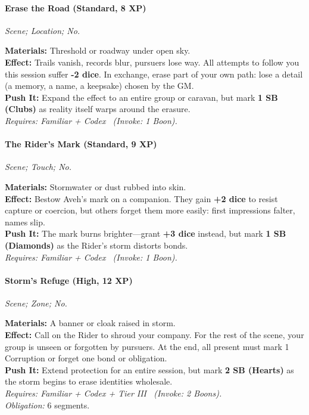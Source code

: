 \paragraph{Erase the Road (Standard, 8 XP)}  
\emph{Scene; Location; No.}  

\textbf{Materials:} Threshold or roadway under open sky.\\
\textbf{Effect:} Trails vanish, records blur, pursuers lose way. All attempts to follow you this session suffer \textbf{-2 dice}. In exchange, erase part of your own path: lose a detail (a memory, a name, a keepsake) chosen by the GM.\\
\textbf{Push It:} Expand the effect to an entire group or caravan, but mark \textbf{1 SB (Clubs)} as reality itself warps around the erasure.\\
\emph{Requires: Familiar + Codex \ (\textit{Invoke:} 1 Boon).}

\paragraph{The Rider’s Mark (Standard, 9 XP)}  
\emph{Scene; Touch; No.}  

\textbf{Materials:} Stormwater or dust rubbed into skin.\\
\textbf{Effect:} Bestow Aveh’s mark on a companion. They gain \textbf{+2 dice} to resist capture or coercion, but others forget them more easily: first impressions falter, names slip.\\
\textbf{Push It:} The mark burns brighter—grant \textbf{+3 dice} instead, but mark \textbf{1 SB (Diamonds)} as the Rider’s storm distorts bonds.\\
\emph{Requires: Familiar + Codex \ (\textit{Invoke:} 1 Boon).}

\paragraph{Storm’s Refuge (High, 12 XP)}  
\emph{Scene; Zone; No.}  

\textbf{Materials:} A banner or cloak raised in storm.\\
\textbf{Effect:} Call on the Rider to shroud your company. For the rest of the scene, your group is unseen or forgotten by pursuers. At the end, all present must mark 1 Corruption or forget one bond or obligation.\\
\textbf{Push It:} Extend protection for an entire session, but mark \textbf{2 SB (Hearts)} as the storm begins to erase identities wholesale.\\
\emph{Requires: Familiar + Codex + Tier III \ (\textit{Invoke:} 2 Boons).}\\
\emph{Obligation:} 6 segments.

